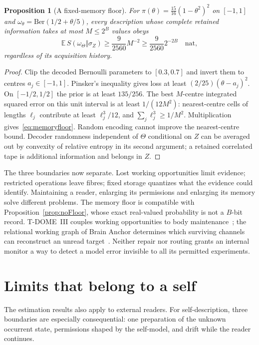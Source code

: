 \documentclass[12pt]{article}
\newtheorem{proposition}[theorem]{Proposition}
\theoremstyle{definition}
\theoremstyle{remark}
\newcommand{\E}{\mathbb E}
\begin{document}
\begin{proposition}[A fixed-memory floor]\label{prop:fixedmemory}
For $\pi(\theta)=\tfrac{15}{16}(1-\theta^2)^2$ on $[-1,1]$ and $\omega_\theta=\mathrm{Ber}(1/2+\theta/5)$, every description whose complete retained information takes at most $M\le2^B$ values obeys
\begin{equation}\label{eq:memoryfloor}
\E\,S(\omega_\Theta\Vert\sigma_Z)\ge
\frac9{2560}M^{-2}\ge\frac9{2560}2^{-2B}\quad\text{nat},
\end{equation}
regardless of its acquisition history.
\end{proposition}

\begin{proof}
Clip the decoded Bernoulli parameters to $[0.3,0.7]$ and invert them to centres $a_j\in[-1,1]$. Pinsker's inequality gives loss at least $(2/25)(\theta-a_j)^2$. On $[-1/2,1/2]$ the prior is at least $135/256$. The best $M$-centre integrated squared error on this unit interval is at least $1/(12M^2)$: nearest-centre cells of lengths $\ell_j$ contribute at least $\ell_j^3/12$, and $\sum_j\ell_j^3\ge1/M^2$. Multiplication gives~\eqref{eq:memoryfloor}. Random encoding cannot improve the nearest-centre bound. Decoder randomness independent of $\Theta$ conditional on $Z$ can be averaged out by convexity of relative entropy in its second argument; a retained correlated tape is additional information and belongs in $Z$.
\end{proof}

The three boundaries now separate. Lost working opportunities limit evidence; restricted operations leave fibres; fixed storage quantizes what the evidence could identify. Maintaining a reader, enlarging its permissions and enlarging its memory solve different problems. The memory floor is compatible with Proposition~\ref{prop:noFloor}, whose exact real-valued probability is not a $B$-bit record. T-DOME~III couples working opportunities to body maintenance~\cite{TDOMEIII}; the relational working graph of Brain Anchor determines which surviving channels can reconstruct an unread target~\cite{BrainAnchor}. Neither repair nor routing grants an internal monitor a way to detect a model error invisible to all its permitted experiments.

\section{Limits that belong to a self}\label{sec:5}

The estimation results also apply to external readers. For self-description, three boundaries are especially consequential: one preparation of the unknown occurrent state, permissions shaped by the self-model, and drift while the reader continues.
\end{document}
